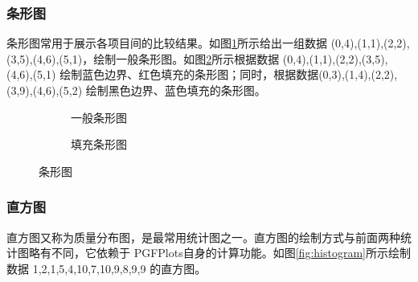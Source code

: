 \subsubsection{条形图}
条形图常用于展示各项目间的比较结果。如图\ref{subfig:strip1}所示给出一组数据 {(0,4),(1,1),(2,2),(3,5),(4,6),(5,1)}，绘制一般条形图。如图\ref{subfig:strip2}所示根据数据 {(0,4),(1,1),(2,2),(3,5),(4,6),(5,1)} 绘制蓝色边界、红色填充的条形图；同时，根据数据{(0,3),(1,4),(2,2),(3,9),(4,6),(5,2)} 绘制黑色边界、蓝色填充的条形图。
\begin{figure}[htb]
	\centering
	\begin{subfigure}[b]{.45\textwidth}
		\centering
		\caption{一般条形图}\label{subfig:strip1}
	\end{subfigure}
	\qquad  \qquad
	\begin{subfigure}[b]{.45\textwidth}
		\centering
		\caption{填充条形图}\label{subfig:strip2}
	\end{subfigure}
	\caption{条形图}\label{fig:strip}
\end{figure}

\subsubsection{直方图}

直方图又称为质量分布图，是最常用统计图之一。直方图的绘制方式与前面两种统计图略有不同，它依赖于 PGFPlots自身的计算功能。如图\ref{fig:histogram}所示绘制数据 {1,2,1,5,4,10,7,10,9,8,9,9} 的直方图。

